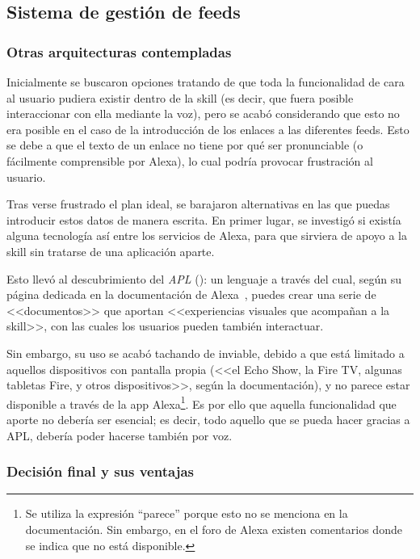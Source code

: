 \documentclass[11pt,spanish,listoffigures,listoftables,table,hyphens,dvipsnames]{tfgetsinf}
\newcommand{\fe}[1]{\foreign{english}{#1}}
\begin{document}
\subsection{Sistema de gestión de feeds}

\subsubsection{Otras arquitecturas contempladas}

Inicialmente se buscaron opciones tratando de que toda la funcionalidad de cara al usuario pudiera existir dentro de la skill (es decir, que fuera posible interaccionar con ella mediante la voz), pero se acabó considerando que esto no era posible en el caso de la introducción de los enlaces a las diferentes feeds. Esto se debe a que el texto de un enlace no tiene por qué ser pronunciable (o fácilmente comprensible por Alexa), lo cual podría provocar frustración al usuario.

Tras verse frustrado el plan ideal, se barajaron alternativas en las que puedas introducir estos datos de manera escrita. En primer lugar, se investigó si existía alguna tecnología así entre los servicios de Alexa, para que sirviera de apoyo a la skill sin tratarse de una aplicación aparte.

Esto llevó al descubrimiento del \emph{APL} (\fe{Alexa Presentation Language}): un lenguaje a través del cual, según su página dedicada en la documentación de Alexa~\cite{apl-doc}, puedes crear una serie de <<documentos>> que aportan <<experiencias visuales que acompañan a la skill>>, con las cuales los usuarios pueden también interactuar.

Sin embargo, su uso se acabó tachando de inviable, debido a que está limitado a aquellos dispositivos con pantalla propia (<<el Echo Show, la Fire TV, algunas tabletas Fire, y otros dispositivos>>, según la documentación), y no parece estar disponible a través de la app Alexa\footnote{Se utiliza la expresión ``parece'' porque esto no se menciona en la documentación. Sin embargo, en el foro de Alexa existen comentarios donde se indica que no está disponible.}. Es por ello que aquella funcionalidad que aporte no debería ser esencial; es decir, todo aquello que se pueda hacer gracias a APL, debería poder hacerse también por voz. 

\subsubsection{Decisión final y sus ventajas}
\end{document}
